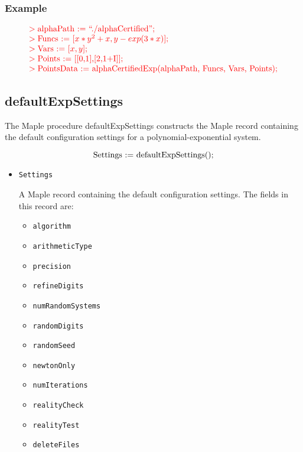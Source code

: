 \documentclass[11pt]{report}
\begin{document}
\subsubsection{Example}

\[
\begin{color}{red}\begin{array}{l}
> \hbox{alphaPath := ``./alphaCertified'';} \\
> \hbox{Funcs := [$x*y^2 + x, y - exp(3*x)$];} \\
> \hbox{Vars := [$x,y$];} \\
> \hbox{Points := [[0,1],[2,1+I]];} \\
> \hbox{PointsData := alphaCertifiedExp(alphaPath, Funcs, Vars, Points);}
\end{array}\end{color}
\]

\subsection{defaultExpSettings}\label{Sec:SettingsExpM}

The Maple procedure defaultExpSettings constructs the Maple record
containing the default configuration settings for a polynomial-exponential system.

\[
\hbox{Settings := defaultExpSettings();}
\]

\begin{itemize}

\item {\tt Settings}

A Maple record containing the default configuration settings.
The fields in this record are:

\begin{itemize}
  \item {\tt algorithm}
  \item {\tt arithmeticType}
  \item {\tt precision}
  \item {\tt refineDigits}
  \item {\tt numRandomSystems}
  \item {\tt randomDigits}
  \item {\tt randomSeed}
  \item {\tt newtonOnly}
  \item {\tt numIterations}
  \item {\tt realityCheck}
  \item {\tt realityTest}
  \item {\tt deleteFiles}
\end{itemize}
\end{itemize}
\end{document}
